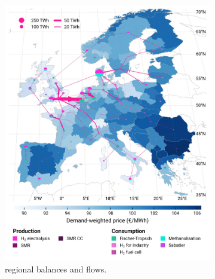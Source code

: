 \documentclass[final,5p,times,twocolumn,sort&compress]{elsarticle}
\begin{document}
\begin{figure}[htbp]
  \centering
  \begin{subfigure}[t]{0.49\textwidth}
      \vspace{0pt}
      \includegraphics[width=1\textwidth]{maps/greenfield-pipelines/base_s_adm___2040-balance_map_H2}
      \vspace{-0.5cm}
      \caption{ regional balances and flows.}
      \label{fig:CP_lt_2040_h2}
  \end{subfigure}
  \hfill
  \begin{subfigure}[t]{0.49\textwidth}
      \vspace{0pt}

\end{subfigure}
\end{figure}
\end{document}
